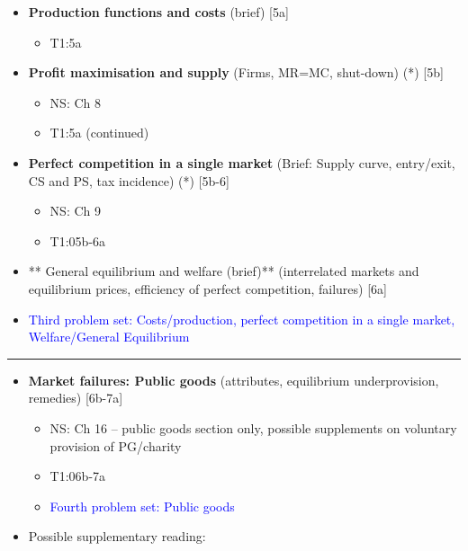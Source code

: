 \documentclass[]{article}
\providecommand{\tightlist}{%
  \setlength{\itemsep}{0pt}\setlength{\parskip}{0pt}}
\begin{document}
\begin{itemize}
\tightlist
\item
  \textbf{Production functions and costs} (brief) {[}5a{]}

  \begin{itemize}
  \tightlist
  \item
    T1:5a
  \end{itemize}
\end{itemize}

\begin{itemize}
\item
  \textbf{Profit maximisation and supply} (Firms, MR=MC, shut-down) (*)
  {[}5b{]}

  \begin{itemize}
  \tightlist
  \item
    NS: Ch 8
  \item
    T1:5a (continued)
  \end{itemize}
\item
  \textbf{Perfect competition in a single market} (Brief: Supply curve,
  entry/exit, CS and PS, tax incidence) (*) {[}5b-6{]}

  \begin{itemize}
  \tightlist
  \item
    NS: Ch 9
  \item
    T1:05b-6a
  \end{itemize}
\item
  ** General equilibrium and welfare (brief)** (interrelated markets and
  equilibrium prices, efficiency of perfect competition, failures)
  {[}6a{]}
\item
  \textcolor{blue}{Third problem set: Costs/production, perfect competition in a single market, Welfare/General Equilibrium }
\end{itemize}

\begin{center}\rule{0.5\linewidth}{\linethickness}\end{center}

\begin{itemize}
\tightlist
\item
  \textbf{Market failures: Public goods} (attributes, equilibrium
  underprovision, remedies) {[}6b-7a{]}

  \begin{itemize}
  \tightlist
  \item
    NS: Ch 16 -- public goods section only, possible supplements on
    voluntary provision of PG/charity
  \item
    T1:06b-7a
  \item
    \textcolor{blue}{Fourth problem set: Public goods }
  \end{itemize}
\item
  Possible supplementary reading:
\end{itemize}
\end{document}
